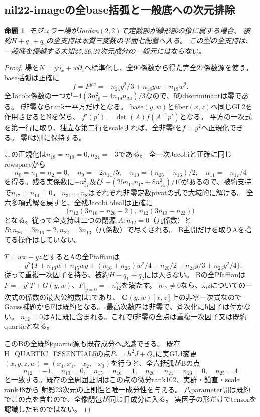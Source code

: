 \documentclass[a4paper,11pt]{ltjsarticle}
\newtheorem{proposition}{命題}[section]
\theoremstyle{definition}
\newcommand{\CC}{\mathbf C}
\begin{document}
\subsection{nil22-imageの全base括弧と一般底への次元排除}
\begin{proposition}\label{prop:nil22-base-two-conics-plane}
モジュラー場がJordan$(2,2)$で定数部が線形部の像に属する場合、
被約$H+q_1+q_2$の全支持は本質三変数の平面七配置へ入る。
この型の全支持は、一般底を優越する未知25,26,27次元成分の一般元にはならない。
\end{proposition}
\begin{proof}
場を$N=y\partial_x+w\partial_z$へ標準化し、全90係数から得た完全27係数源を使う。
base括弧は正確に
\[
 f=P^{yw}=-n_{24}y^2/3+n_{18}yw+n_{19}w^2.
\]
全Jacobi係数の一つが$-4(3n_{18}^2+4n_{19}n_{24})/3$なので、fのdiscriminantは零である。
f非零ならrank一平方だけとなる。
base$(y,w)$とfiber$(x,z)$へ同じGL2を作用させるとNを保ち、
$f'(p')=\det(A)f(A^{-1}p')$となる。
平方の一次式を第一行に取り、独立な第二行をscaleすれば、全非零fを$f=y^2$へ正規化できる。
零fは別に保持する。

この正規化は$n_{18}=n_{19}=0,n_{24}=-3$である。
全一次Jacobiと正確に同じrowspaceから
\[
 n_0=n_1=n_2=0,\quad n_9=-2n_{14}/5,\quad
 n_{10}=(n_{26}-n_{16})/2,\quad n_{11}=-n_{17}/4
\]
を得る。残る実係数に$-n_{17}^2$及び
$-(25n_{12}n_{17}+8n_{14}^2)/10$があるので、被約支持で$n_{17}=n_{14}=0$。
$n_3,\ldots,n_8$はそれぞれ非零定数pivotの式で大域的に解ける。
全六多項式解を戻すと、全残Jacobi idealは正確に
\[
 \bigl(n_{12}(3n_{16}-n_{26}-2),\ n_{12}(3n_{13}-n_{22})\bigr)
\]
となる。従って全支持は二つの閉源
$A:n_{12}=0$（九係数）と
$B:n_{26}=3n_{16}-2,n_{22}=3n_{13}$（八係数）で尽くされる。
B主開だけを取りAを捨てる操作はしていない。

$T=wx-yz$とするとAの全Pfaffianは
\[
 -y^2\{T+n_{13}w+n_{15}wy+(n_{16}+n_{26})w^2/4
              +n_{20}/2+n_{21}y/3+n_{23}y^2/4\}.
\]
従って重複一次因子を持ち、被約$H+q_1+q_2$には入らない。
Bの全Pfaffianは$F=-y^2T+G(y,w)$、$F|_{y=0}=-n_{12}^2$を満たす。
$n_{12}\ne0$なら、x,zについての一次式の係数の最大公約数は1であり、
$\CC(y,w)[x,z]$上の非零一次式なのでGauss補題からFは既約となる。
最高次数四は非零で、斉次化にh因子は付かない。
$n_{12}=0$はAに既に含まれる。これでf非零の全点は重複一次因子又は既約quarticとなる。

このBの全既約quartic源も既存成分へ認識できる。
既存H\_QUARTIC\_ESSENTIAL5の点$P_*=h^2J+Q_*$に実GL4変更
$(x,y,z,w)=(x_4,x_1,-x_2,-x_3)$を行うと、全六括弧がBの点
\[
 n_{12}=-1,\quad n_{13}=0,\quad n_{15}=n_{16}=1,
 \quad n_{20}=n_{21}=n_{23}=0,\quad n_{25}=4
\]
と一致する。既存の全周囲証明はこの点の微分rank102、実群・鉛直・scale rank48から
射影23次元の正則性と唯一成分性を与える。
八parameter開は既約でこの点を含むので、全像閉包が同じ旧成分に入る。
実因子の形だけでtensorを認識したものではない。


\end{proof}
\end{document}
